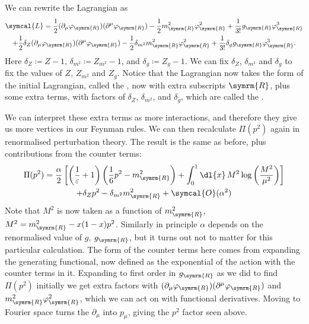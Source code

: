 \documentclass[fleqn]{NotesClass}
\newcommand{\lagrangianDensity}{\symcal{L}}
\newcommand{\order}{\symcal{O}}
\newcommand{\renormalised}{\symrm{R}}
\begin{document}
    We can rewrite the Lagrangian as
    \begin{multline}
        \lagrangianDensity = \frac{1}{2}(\partial_\mu \varphi_{\renormalised})(\partial^\mu \varphi_{\renormalised}) - \frac{1}{2}m_{\renormalised}^2\varphi_{\renormalised}^2 + \frac{1}{3!} g_{\renormalised} \varphi_{\renormalised}^3\\
        + \frac{1}{2}\delta_Z(\partial_\mu \varphi_{\renormalised})(\partial^\mu \varphi_{\renormalised}) - \frac{1}{2}\delta_{m^2} m_{\renormalised}^2 \varphi_{\renormalised}^2 + \frac{1}{3!}\delta_g g_{\renormalised} \varphi_{\renormalised}^3.
    \end{multline}
    Here \(\delta_Z \coloneqq Z - 1\), \(\delta_{m^2} \coloneqq Z_{m^2} - 1\), and \(\delta_{g} \coloneqq Z_g - 1\).
    We can fix \(\delta_Z\), \(\delta_{m^2}\) and \(\delta_g\) to fix the values of \(Z\), \(Z_{m^2}\) and \(Z_g\).
    Notice that the Lagrangian now takes the form of the initial Lagrangian, called the , now with extra subscripts \(\renormalised\), plus some extra terms, with factors of \(\delta_Z\), \(\delta_{m^2}\), and \(\delta_g\), which are called the .
    
    We can interpret these extra terms as more interactions, and therefore they give us more vertices in our Feynman rules.
    We can then recalculate \(\Pi(p^2)\) again in renormalised perturbation theory.
    The result is the same as before, plus contributions from the counter terms:
    \begin{multline}
        \Pi(p^2) = \frac{\alpha}{2}\left[ \left( \frac{1}{\varepsilon} + 1 \right) \left( \frac{1}{6}p^2 - m_{\renormalised}^2 \right) + \int_0^1 \dl{x} \, M^2 \log\left( \frac{M^2}{\mu^2} \right) \right]\\
        + \delta_{Z} p^2 - \delta_{m^2}m_{\renormalised}^2 + \order(\alpha^2)
    \end{multline}
    Note that \(M^2\) is now taken as a function of \(m_{\renormalised}^2\), \(M^2 = m_{\renormalised}^2 - x(1 - x)p^2\).
    Similarly in principle \(\alpha\) depends on the renormalised value of \(g\), \(g_{\renormalised}\), but it turns out not to matter for this particular calculation.
    The form of the counter terms here comes from expanding the generating functional, now defined as the exponential of the action with the counter terms in it.
    Expanding to first order in \(g_{\renormalised}\) as we did to find \(\Pi(p^2)\) initially we get extra factors with \((\partial_\mu \varphi_{\renormalised})(\partial^\mu \varphi_{\renormalised})\) and \(m_{\renormalised}^2 \varphi_{\renormalised}^2\), which we can act on with functional derivatives.
    Moving to Fourier space turns the \(\partial_\mu\) into \(p_\mu\), giving the \(p^2\) factor seen above.
    
\end{document}
